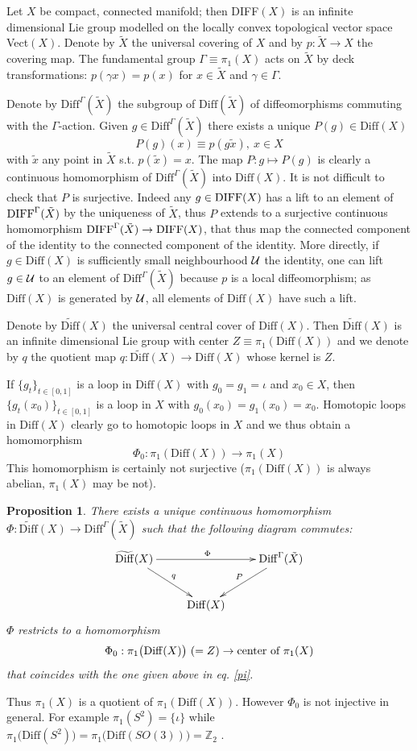 \documentclass[11pt]{article}
\def\g{\gamma}
\def\Ga{\Gamma}
\newtheorem{proposition}[theorem]{Proposition}
\def\Diff{{\rm Diff}}
\def\Diff{{\mathrm {Diff}}}
\begin{document}
Let $X$ be compact, connected manifold; then DIFF$(X)$ is an infinite dimensional Lie group modelled on the locally convex topological vector space Vect$(X)$.
Denote by $\tilde X$ the universal covering of $X$ and by $p:\tilde 
X\to X$ the covering map. The fundamental group $\Ga\equiv \pi_1(X)$ 
acts on $\tilde X$ by deck transformations: $p(\g x)=p(x)$ for 
$x\in\tilde X$ and $\g\in \Ga$.

Denote by $\Diff^{\Ga}(\tilde X)$ the subgroup of $\Diff(\tilde X)$ 
of diffeomorphisms commuting with the $\Ga$-action. Given 
$g\in\Diff^{\Ga}(\tilde X)$ there exists a unique $P(g)\in\Diff(X)$
\[
P(g)(x) \equiv p(g\tilde x), \ x\in X
\]
with $\tilde x$ any point in $\tilde X$ s.t. $p(\tilde x) = x$. The 
map $P: g\mapsto P(g)$ is clearly a continuous homomorphism of 
$\Diff^{\Ga}(\tilde X)$ into $\Diff(X)$. It is not difficult to check 
that $P$ is surjective. Indeed any $g\in {\rm DIFF}(X)$ has a lift to 
an element of ${\rm DIFF}^{\Ga}(\tilde X)$ by the uniqueness of $\tilde X$, 
thus $P$ extends to a surjective continuous homomorphism 
${\rm DIFF}^{\Ga}(\tilde X)\to {\rm DIFF}(X)$, that thus map the 
connected component of the identity to the 
connected component of the identity. More directly, if $g\in\Diff(X)$ 
is sufficiently small neighbourhood $\cal U$ the identity,
one can lift $g\in\cal U$ to an element of $\Diff^{\Ga}(\tilde X)$ because $p$ 
is a local diffeomorphism; as $\Diff(X)$ is generated by $\cal U$, 
all elements of $\Diff(X)$ have such a lift.

Denote by $\widetilde\Diff(X)$ the universal central cover of $\Diff(X)$. Then 
$\widetilde\Diff(X)$ is an infinite dimensional Lie group with center 
$Z\equiv \pi_1(\Diff(X))$ and we denote by $q$ the quotient map 
$q:\widetilde\Diff(X)\to \Diff(X)$ whose kernel is $Z$.

If $\{g_t\}_{t\in [0,1]}$ is a loop in $\Diff(X)$ with $g_0 = g_1 = 
\iota$ and $x_0\in X$, then $\{g_t(x_0)\}_{t\in [0,1]}$ 
is a loop in $X$ with $g_0(x_0) = g_1(x_0) = 
x_0$. Homotopic loops in $\Diff(X)$ clearly go to homotopic loops in 
$X$ and we thus obtain a homomorphism 
\begin{equation}\label{pi}
\Phi_0 :  \pi_1(\Diff(X)) \to  \pi_1(X)
\end{equation}
This homomorphism is certainly not surjective ($\pi_1(\Diff(X))$ is 
always abelian, $\pi_1(X)$ may be not). 
%
\begin{proposition} There exists a unique continuous homomorphism 
$\Phi:\widetilde\Diff(X)\to\Diff^{\Ga}(\tilde X)$ such that the following 
diagram commutes:
\[
\xymatrix{
\widetilde\Diff(X)  \ar[rr]^{\Phi} \ar[dr]^{q}& 
&  \Diff^{\Ga}(\tilde X) \ar[dl]_{P}  \\
& \Diff(X) }
\]
$\Phi$ restricts to a homomorphism
\begin{equation}\label{cen}
\Phi_0: \pi_1\big(\Diff(X)\big)\ (= Z) \to \text{\rm center of}\ \pi_1(X)
\end{equation}
that coincides with the one given above in eq. \eqref{pi}.
\end{proposition}
Thus $\pi_1(X)$ is a quotient of $\pi_1(\Diff(X))$. However $\Phi_0$ is 
not injective in general. For example $\pi_1(S^2)= \{\iota\}$ while 
$\pi_1\big(\Diff(S^2)\big)=\pi_1\big(\Diff(SO(3))\big)=\mathbb Z_2$ \cite{M} .
\end{document}
